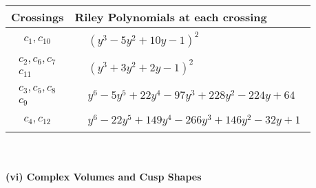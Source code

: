 \documentclass[1p]{elsarticle_modified}
\theoremstyle{definition}
\begin{document}
\begin{tabular}{m{50pt}|m{274pt}}
Crossings & \hspace{64pt}Riley Polynomials at each crossing \\
\hline $$\begin{aligned}c_{1},c_{10}\end{aligned}$$&$\begin{aligned}
&(y^3-5 y^2+10 y-1)^2
\end{aligned}$\\
\hline $$\begin{aligned}c_{2},c_{6},c_{7}\\c_{11}\end{aligned}$$&$\begin{aligned}
&(y^3+3 y^2+2 y-1)^2
\end{aligned}$\\
\hline $$\begin{aligned}c_{3},c_{5},c_{8}\\c_{9}\end{aligned}$$&$\begin{aligned}
&y^6-5 y^5+22 y^4-97 y^3+228 y^2-224 y+64
\end{aligned}$\\
\hline $$\begin{aligned}c_{4},c_{12}\end{aligned}$$&$\begin{aligned}
&y^6-22 y^5+149 y^4-266 y^3+146 y^2-32 y+1
\end{aligned}$\\
\hline
\end{tabular}\\~\\
\newpage\flushleft \textbf{(vi) Complex Volumes and Cusp Shapes}
\end{document}
